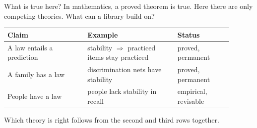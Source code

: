 \documentclass[aspectratio=169,11pt]{beamer}
\begin{document}
\begin{frame}{What is true here?}
  In mathematics, a proved theorem is true. Here there are only competing theories. What can a library build on?
  \bigskip
  \small
  \begin{tabular}{p{0.32\linewidth}p{0.36\linewidth}p{0.22\linewidth}}
    \toprule
    Claim & Example & Status\\
    \midrule
    A law entails a prediction & stability $\Rightarrow$ practiced items stay practiced & proved, permanent\\
    A family has a law & discrimination nets have stability & proved, permanent\\
    People have a law & people lack stability in recall & empirical, revisable\\
    \bottomrule
  \end{tabular}
  \bigskip

  \normalsize
  Which theory is right follows from the second and third rows together.
\end{frame}
\end{document}
